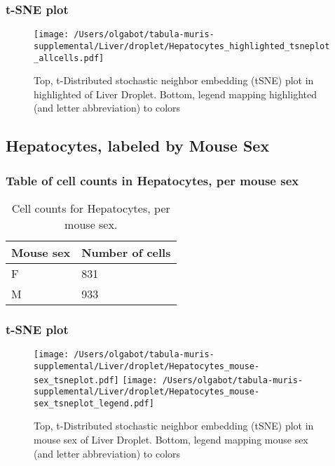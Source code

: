 \clearpage
\subsubsection{t-SNE plot}
\begin{figure}[h]
\centering
\texttt{[image: /Users/olgabot/tabula-muris-supplemental/Liver/droplet/Hepatocytes\_highlighted\_tsneplot\_allcells.pdf]}

\caption{Top, t-Distributed stochastic neighbor embedding (tSNE) plot  in highlighted of Liver Droplet. Bottom, legend mapping highlighted (and letter abbreviation) to colors}
\end{figure}


\clearpage
\subsection{Hepatocytes, labeled by Mouse Sex}
\subsubsection{Table of cell counts in Hepatocytes, per mouse sex}\begin{table}[h]
\centering
\label{my-label}
\begin{tabular}{@{}ll@{}}
\toprule

Mouse sex& Number of cells \\ \midrule
F & 831 \\

M & 933 \\
\bottomrule
\end{tabular}
\caption{Cell counts for Hepatocytes, per mouse sex.}
\end{table}

\clearpage
\subsubsection{t-SNE plot}
\begin{figure}[h]
\centering
\texttt{[image: /Users/olgabot/tabula-muris-supplemental/Liver/droplet/Hepatocytes\_mouse-sex\_tsneplot.pdf]}
\texttt{[image: /Users/olgabot/tabula-muris-supplemental/Liver/droplet/Hepatocytes\_mouse-sex\_tsneplot\_legend.pdf]}
\caption{Top, t-Distributed stochastic neighbor embedding (tSNE) plot  in mouse sex of Liver Droplet. Bottom, legend mapping mouse sex (and letter abbreviation) to colors}
\end{figure}



